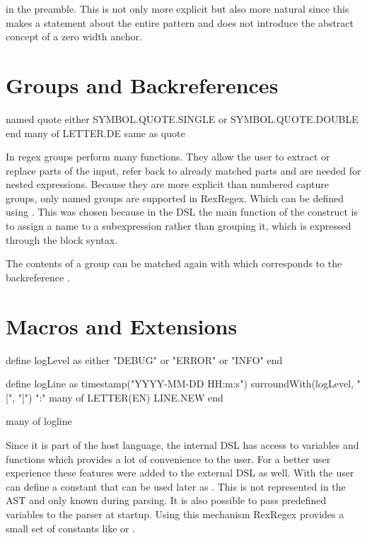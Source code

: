 in the preamble. This is not only more explicit but also more natural since this makes a statement about the entire pattern and does not introduce the abstract concept of a zero width anchor.

\section{Groups and Backreferences}

\begin{rexregexBox}[label=code:dslGroupsAndBackrefs,title=Groups and Backreferences in RexRegex]
named quote
    either SYMBOL.QUOTE.SINGLE or SYMBOL.QUOTE.DOUBLE
end
many of LETTER.DE
same as quote
\end{rexregexBox}

In regex groups perform many functions. They allow the user to extract or replace parts of the input, refer back to already matched parts and are needed for nested expressions. Because they are more explicit than numbered capture groups, only named groups are supported in RexRegex. Which can be defined using . This was chosen because in the DSL the main function of the construct is to assign a name to a subexpression rather than grouping it, which is expressed through the block syntax.

The contents of a group can be matched again with  which corresponds to the backreference . 

\section{Macros and Extensions} \label{sec:macros}

\begin{rexregexBox}[float=htb,label=code:dslMacros,title=Usage of Macros in RexRegex,width=12cm,center]
define logLevel as
    either "DEBUG" or "ERROR" or "INFO"
end

define logLine as
    timestamp("YYYY-MM-DD HH:m:s")
    surroundWith(logLevel, "[", "]")
    ":"
    many of LETTER(EN)
    LINE.NEW
end

many of logline
\end{rexregexBox}

Since it is part of the host language, the internal DSL has access to variables and functions which provides a lot of convenience to the user. For a better user experience these features were added to the external DSL as well. With  the user can define a constant that can be used later as . This is not represented in the AST and only known during parsing. It is also possible to pass predefined variables  to the parser at startup. Using this mechanism RexRegex provides a small set of constants like  or . 

